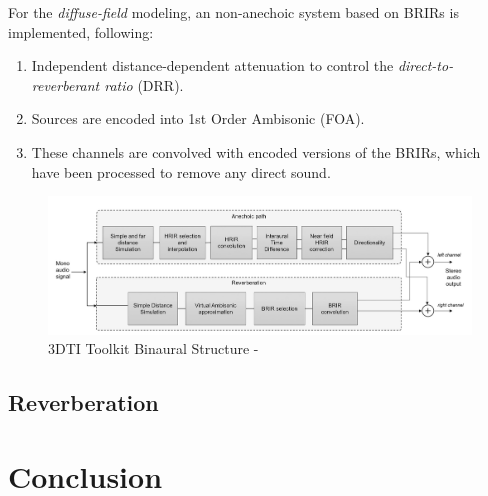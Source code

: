 For the \textit{diffuse-field} modeling, an non-anechoic system based on BRIRs is implemented, following:

\begin{enumerate}
    \item Independent distance-dependent attenuation to control the \textit{direct-to-reverberant ratio} (DRR). 
    \item Sources are encoded into 1st Order Ambisonic (FOA).
    \item These channels are convolved with encoded versions of the BRIRs, which have been processed to remove any direct sound.
\end{enumerate}

\begin{figure}[ht!]%
\centering
\includegraphics[width=1.0\textwidth]{img/3dti-chain.png} 
\caption{3DTI Toolkit Binaural Structure - \cite{cuevas20193d}}
\label{fig:3dti-chain}
\end{figure}


\subsection{Reverberation}










\section{Conclusion}